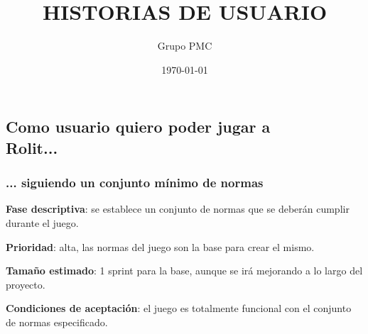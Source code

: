 \documentclass[../../FINAL/Scrum/SCRUM.tex]{subfiles}
\title{HISTORIAS DE USUARIO}
\date{\today}
\author{Grupo PMC}
\begin{document}


\setcounter{secnumdepth}{3}

\subsection{Como usuario quiero poder jugar a \\ Rolit...}
\subsubsection{... siguiendo un conjunto mínimo de normas}
\textbf{Fase descriptiva}: se establece un conjunto de normas que se deberán cumplir durante el juego.

\textbf{Prioridad}: alta, las normas del juego son la base para crear el mismo.

\textbf{Tamaño estimado}: 1 sprint para la base, aunque se irá mejorando a lo largo del proyecto.

\textbf{Condiciones de aceptación}: el juego es totalmente funcional con el conjunto de normas especificado.
\end{document}
